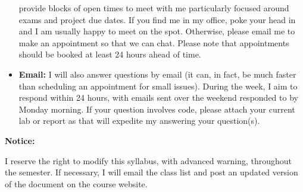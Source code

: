 \documentclass[12pt]{article}
\begin{document}
\begin{itemize}
provide blocks of open times to meet with me particularly focused around
exams and project due dates. If you find me in my office, poke your head in
and I am usually happy to meet on the spot. Otherwise, please email me to make
an appointment so that we can chat. Please note that appointments should
be booked at least 24 hours ahead of time.
\item \textbf{Email:} I will also answer questions by email (it can, in fact,
be much faster than scheduling an appointment for small issues). During the
week, I aim to respond within 24 hours, with emails sent over the weekend
responded to by Monday morning. If your question involves code, please attach
your current lab or report as that will expedite my answering your question(s).
\end{itemize}

\bigskip

\textbf{Notice:} \vspace{6pt}

I reserve the right to modify this syllabus, with advanced warning, throughout
the semester. If necessary, I will email the class list and post an updated
version of the document on the course website.
\end{document}
